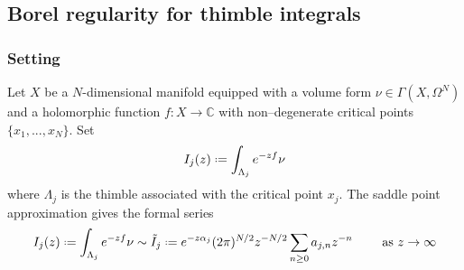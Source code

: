 \documentclass{article}
\let\Re\relax
\DeclareMathOperator{\Re}{Re}
\theoremstyle{definition}
\newcommand{\C}{\mathbb{C}}
\newcommand*{\defeq}{\mathrel{\vcenter{\baselineskip0.5ex \lineskiplimit0pt
                     \hbox{\scriptsize.}\hbox{\scriptsize.}}}%
                     =}
\newcommand{\borel}{\mathcal{B}}
\begin{document}




\subsection{Borel regularity for thimble integrals}\label{borel-reg-thimble}

\subsubsection{Setting}

Let $X$ be a $N$-dimensional manifold equipped with a volume form $\nu\in\Gamma(X,\Omega^N)$ and a holomorphic function $f\colon X\to\C$ with non--degenerate critical points $\{x_1,...,x_N\}$. Set
\begin{equation}\label{exp-int}
I_j(z)\defeq\int_{\Lambda_j}e^{-zf}\nu
\end{equation}
where $\Lambda_j$ is the thimble associated with the critical point $x_j$.  
The saddle point approximation gives the formal series 
\begin{equation}
{I}_{j}(z)\defeq\int_{\Lambda_j}e^{-zf}\nu\sim \tilde{I}_{j}\defeq e^{-z\alpha_j}(2\pi)^{N/2} z^{-N/2}\sum_{n\geq 0}a_{j,n}z^{-n} \qquad \text{ as } \Re z\to\infty
\end{equation}
\end{document}
